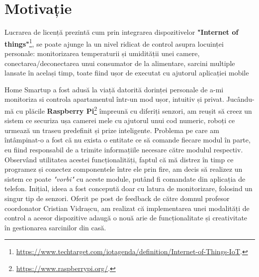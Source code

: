 \chapter*{Motivație} 
Lucrarea de licență prezintă cum prin integrarea dispozitivelor \textbf{"Internet of things"}\footnote{\url{https://www.techtarget.com/iotagenda/definition/Internet-of-Things-IoT}.}, se poate ajunge la un nivel ridicat de control asupra locuinței personale: monitorizarea temperaturii și umidității unei camere, conectarea/deconectarea unui consumator de la alimentare, sarcini multiple lansate în același timp, toate fiind ușor de executat cu ajutorul aplicației mobile

Home Smartup a fost adusă la viață datorită dorinței personale de a-mi monitoriza si controla apartamentul într-un mod ușor, intuitiv și privat. Jucându-mă cu plăcile \textbf{Raspberry Pi}\footnote{\url{https://www.raspberrypi.org/}.} împreună cu diferiți senzori, am reușit să creez un sistem ce securiza ușa camerei mele cu ajutorul unui cod numeric, roboți ce urmează un traseu predefinit și prize inteligente. Problema pe care am întâmpinat-o a fost că nu exista o entitate ce să comande fiecare modul în parte, eu fiind responsabil de a trimite informațiile necesare către modulul respectiv. Observând utilitatea acestei funcționalități, faptul că mă distrez în timp ce programez și conectez componentele între ele prin fire, am decis să realizez un sistem ce poate \emph{"vorbi"} cu aceste module, putând fi comandate din aplicația de telefon.
Inițial, ideea a fost concepută doar cu latura de monitorizare, folosind un singur tip de senzori. Oferit pe post de feedback de către domnul profesor coordonator Cristian Vidrașcu, am realizat că implementarea unei modalități de control a acesor dispozitive adaugă o nouă arie de funcționalitate și creativitate în gestionarea sarcinilor din casă.
